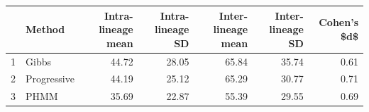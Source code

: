 \begin{table}[ht]
\centering
\begin{tabular}{rlrrrrr}
  \hline
 & Method & Intra-lineage mean & Intra-lineage SD & Inter-lineage mean & Inter-lineage SD & Cohen's \$d\$ \\ 
  \hline
1 & Gibbs & 44.72 & 28.05 & 65.84 & 35.74 & 0.61 \\ 
  2 & Progressive & 44.19 & 25.12 & 65.29 & 30.77 & 0.71 \\ 
  3 & PHMM & 35.69 & 22.87 & 55.39 & 29.55 & 0.69 \\ 
   \hline
\end{tabular}
\end{table}
